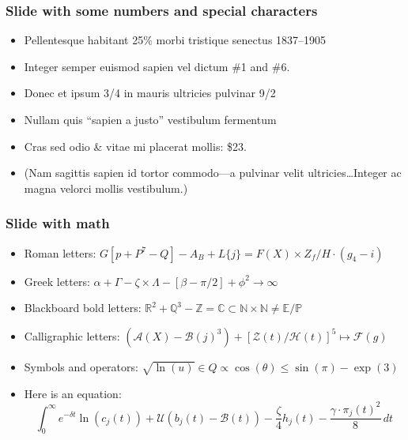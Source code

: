\documentclass[11pt, aspectratio=169, xcolor={dvipsnames}, usepdftitle=false]{beamer}
\begin{document}
\begin{frame}
\frametitle{Slide with some numbers and special characters} 
\begin{itemize}
\item Pellentesque habitant 25\% morbi tristique senectus 1837--1905
\item Integer semper euismod sapien vel dictum \#1 and \#6.
\item  Donec et ipsum 3/4 in mauris ultricies pulvinar 9/2
\item Nullam quis ``sapien a justo'' vestibulum fermentum
\item Cras sed odio \& vitae mi placerat mollis: \$23.
\item (Nam sagittis sapien id tortor commodo---a pulvinar velit ultricies\ldots Integer ac magna velorci mollis vestibulum.)
\end{itemize}	
\end{frame}

\begin{frame}
\frametitle{Slide with math}
\begin{itemize}
\item Roman letters: $G[p + P^7-Q] - A_B + L\{j\} = F(X) \times Z_f/H \cdot (g_4 - i)$
\item Greek letters: $\alpha + \Gamma - \zeta \times \Lambda - [\beta - \pi/2] + \phi^2 \to \infty$
\item Blackboard bold letters: $\mathbb{R}^2 + \mathbb{Q}^3 - \mathbb{Z} = \mathbb{C} \subset \mathbb{N} \times \mathbb{N} \neq \mathbb{E} / \mathbb{P}$
\item Calligraphic letters: $(\mathcal{A}(X) - \mathcal{B}(j)^3) + [\mathcal{Z}(t) / \mathcal{H}(t)]^5 \mapsto \mathcal{F}(g) $
\item Symbols and operators: $\sqrt{\ln(u)} \in Q \propto \cos(\theta) \leq \sin(\pi) - \exp(3)$
\item Here is an equation:
\begin{equation*}
\int_{0}^{\infty}e^{-\delta t} \ln(c_{j}(t))+ \mathcal{U}(b_{j}(t) - \mathcal{B}(t))- \frac{\zeta}{4} h_{j}(t) -\frac{\gamma \cdot \pi_{j}(t)^2}{8}\,dt
\end{equation*}
\end{itemize}
\end{frame}
\end{document}
